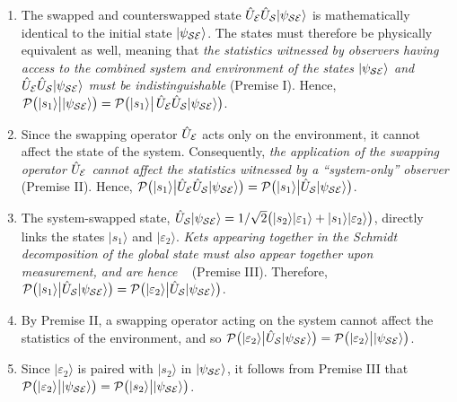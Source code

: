 \documentclass[12pt]{iopart}
\begin{document}
\begin{enumerate}
\item The swapped and counterswapped state $\hat{U}_{\cal{E}} \hat{U}_{\cal{S}}|\psi_{\cal SE}\rangle$ is mathematically identical to the initial state $|\psi_{\cal SE}\rangle$. The states must therefore be physically equivalent as well, meaning that \textit{the statistics witnessed by observers having access to the combined system and environment of the states $|\psi_{\cal SE}\rangle$ and $\hat{U}_{\cal{E}} \hat{U}_{\cal{S}}|\psi_{\cal SE}\rangle$ must be indistinguishable} (Premise I). Hence, ${\cal P}\big(|s_1\rangle {\big |} |\psi_{\cal SE} \rangle \big) = {\cal P}\big(|s_1\rangle {\big |} \, \hat{U}_{\cal{E}} \hat{U}_{\cal{S}} |\psi_{\cal SE} \rangle \big)$.

\item Since the swapping operator $\hat{U}_{\cal{E}}$ acts only on the environment, it cannot affect the state of the system. Consequently, \textit{the application of the swapping operator $\hat{U}_{\cal{E}}$ cannot affect the statistics witnessed by a ``system-only'' observer} (Premise II). Hence, ${\cal P}\big(|s_1\rangle {\big |} \hat{U}_{\cal{E}} \hat{U}_{\cal{S}} |\psi_{\cal SE} \rangle \big)={\cal P}\big(|s_1\rangle {\big |}\hat{U}_{\cal{S}} |\psi_{\cal SE} \rangle \big)$.

\item The system-swapped state, $\hat{U}_{\cal{S}} |\psi_{\cal SE}\rangle=1/\sqrt{2}\big(|s_2\rangle |\varepsilon_1\rangle + |s_1\rangle|\varepsilon_2\rangle \big)$, directly links the states $|s_1\rangle$ and $|\varepsilon_2\rangle$. \textit{Kets appearing together in the Schmidt decomposition of the global state must also appear together upon measurement, and are hence }~\cite{footnote:02} (Premise III). Therefore, ${\cal P}\big(|s_1\rangle {\big |}\hat{U}_{\cal S} |\psi_{\cal SE}\rangle \big) = {\cal P}\big(|\varepsilon_2\rangle {\big |} \hat{U}_{\cal S} |\psi_{\cal SE}\rangle \big)$.

\item By Premise II, a swapping operator acting on the system cannot affect the statistics of the environment, and so ${\cal P}\big(|\varepsilon_2\rangle {\big |} \hat{U}_{\cal S} |\psi_{\cal SE}\rangle \big)= {\cal P}\big(|\varepsilon_2\rangle {\big |} |\psi_{\cal SE}\rangle \big)$.

\item Since $|\varepsilon_2\rangle$ is paired with $|s_2\rangle$ in $|\psi_{\cal SE}\rangle$, it follows from Premise III that ${\cal P}\big(|\varepsilon_2\rangle {\big |} |\psi_{\cal SE} \rangle \big)={\cal P}\big(|s_2\rangle {\big |} |\psi_{\cal SE} \rangle \big)$.
\end{enumerate}
\end{document}
